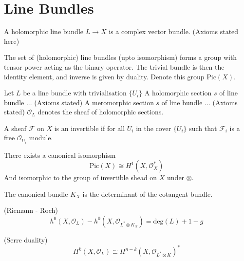 \section{Line Bundles} %

\begin{definition}
A holomorphic line bundle $ L \rightarrow  X$ is a complex vector bundle. 
    (Axioms stated here)
\end{definition}

The set of (holomorphic) line bundles (upto isomorphism) forms a group with tensor power acting as the binary operator.
The trivial bundle is then the identity element, and inverse is given by duality.
Denote this group $ \mathrm{Pic}(X) $. 

\begin{definition}
    Let $L$ be a line bundle with trivialisation $\{ U_i \} $ 
    A holomorphic section $s$ of line bundle ... (Axioms stated)
    A meromorphic section $s$ of line bundle ... (Axioms stated)
    $\mathcal{O}_L $ denotes the sheaf of holomorphic sections. 
\end{definition}

\begin{definition}
    A sheaf $ \mathcal{F} $ on $ X$ is an invertible if for all $U_i$  in the cover $\{U_i\} $ 
    such that $ \mathcal{F}_i$ is a free $\mathcal{O}_{U_i} $ module. 
\end{definition}

\begin{theorem}
    There exists a canonical isomorphism 
    \begin{equation}
        \mathrm{Pic} (X)  \cong H^1 ( X, \mathcal{O}^* _ X ) 
    \end{equation}
    And isomorphic to the group of invertible shead on $X$ under $ \otimes$. 
\end{theorem}

\begin{definition}
    The canonical bundle $ K_X $ is the determinant of the cotangent bundle. 
\end{definition}

\begin{theorem}
    (Riemann - Roch) 
    \begin{equation}
        h^0 (X, \mathcal{O} _L) - h^0 (X, \mathcal{O}_{L^* \otimes K_X}) = \mathrm{deg} (L) + 1 - g 
    \end{equation}
\end{theorem}

\begin{theorem}
    (Serre duality) 
    \begin{equation}
        H^k ( X, \mathcal{O}_L ) \cong H^{n-k} (X, \mathcal{O}_{L ^* \otimes K}) ^* 
    \end{equation}
\end{theorem}


